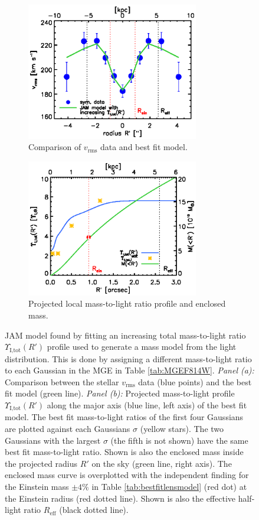 \begin{figure}
\centering
\begin{subfigure}{.5\textwidth}
  \centering
  \includegraphics[height=6cm]{fig/jam_G_vrms.ps}
  \caption{Comparison of $v_\text{rms}$ data and best fit model.}
  \label{fig:JAM_modelG}
\end{subfigure}%
\begin{subfigure}{.5\textwidth}
  \centering
  \includegraphics[height=6cm]{fig/jam_G_enclMass.ps}
  \caption{Projected local mass-to-light ratio profile and enclosed mass.}
  \label{fig:enclMass_modelG}
\end{subfigure}
\caption{JAM model found by fitting an increasing total mass-to-light ratio $\Upsilon_\text{I,tot}(R')$ profile used to generate a mass model from the light distribution.  This is done by assigning a different mass-to-light ratio to each Gaussian in the MGE in Table \ref{tab:MGEF814W}. \emph{Panel (a):} Comparison between the stellar $v_\text{rms}$ data (blue points) and the best fit model (green line). \emph{Panel (b):} Projected mass-to-light profile $\Upsilon_\text{I,tot}(R')$ along the major axis (blue line, left axis) of the best fit model. The best fit mass-to-light ratios of the first four Gaussians are plotted against each Gaussians $\sigma$ (yellow stars). The two Gaussians with the largest $\sigma$ (the fifth is not shown) have the same best fit mass-to-light ratio. Shown is also the enclosed mass inside the projected radius $R'$ on the sky (green line, right axis). The enclosed mass curve is overplotted with the independent finding for the Einstein mass $\pm 4 \%$ in Table \ref{tab:bestfitlensmodel} (red dot) at the Einstein radius (red dotted line). Shown is also the effective half-light ratio $R_\text{eff}$ (black dotted line).   }
\label{fig:modelG}
\end{figure}

